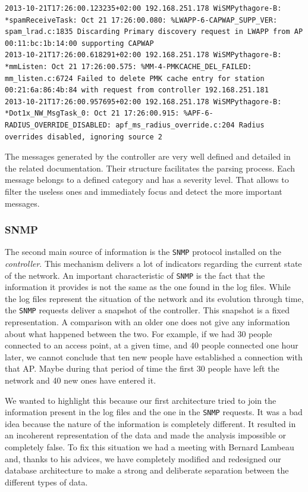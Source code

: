 \begin{lstlisting}[frame=single,breaklines=true,caption={Example of a controller log file}]
2013-10-21T17:26:00.123235+02:00 192.168.251.178 WiSMPythagore-B: *spamReceiveTask: Oct 21 17:26:00.080: %LWAPP-6-CAPWAP_SUPP_VER: spam_lrad.c:1835 Discarding Primary discovery request in LWAPP from AP 00:11:bc:1b:14:00 supporting CAPWAP
2013-10-21T17:26:00.618291+02:00 192.168.251.178 WiSMPythagore-B: *mmListen: Oct 21 17:26:00.575: %MM-4-PMKCACHE_DEL_FAILED: mm_listen.c:6724 Failed to delete PMK cache entry for station 00:21:6a:86:4b:84 with request from controller 192.168.251.181
2013-10-21T17:26:00.957695+02:00 192.168.251.178 WiSMPythagore-B: *Dot1x_NW_MsgTask_0: Oct 21 17:26:00.915: %APF-6-RADIUS_OVERRIDE_DISABLED: apf_ms_radius_override.c:204 Radius overrides disabled, ignoring source 2 
\end{lstlisting}

The messages generated by the controller are very well defined and detailed in the related documentation. Their structure facilitates the parsing process. Each message belongs to a defined category and has a severity level. That allows to filter the useless ones and immediately focus and detect the more important messages.

\subsubsection{SNMP}
The second main source of information is the \texttt{SNMP} protocol installed on the \emph{controller}. This mechanism delivers a lot of indicators regarding the current state of the network. An important characteristic of \texttt{SNMP} is the fact that the information it provides is not the same as the one found in the log files. While the log files represent the situation of the network and its evolution through time, the \texttt{SNMP} requests deliver a snapshot of the controller. This snapshot is a fixed representation. A comparison with an older one does not give any information about what happened between the two. For example, if we had 30 people connected to an access point, at a given time, and 40 people connected one hour later, we cannot conclude that ten new people have established a connection with that AP. Maybe during that period of time the first 30 people have left the network and 40 new ones have entered it. 

We wanted to highlight this because our first architecture tried to join the information present in the log files and the one in the \texttt{SNMP} requests. It was a bad idea because the nature of the information is completely different. It resulted in an incoherent representation of the data and made the analysis impossible or completely false. To fix this situation we had a meeting with Bernard Lambeau and, thanks to his advices, we have completely modified and redesigned our database architecture to make a strong and deliberate separation between the different types of data.

